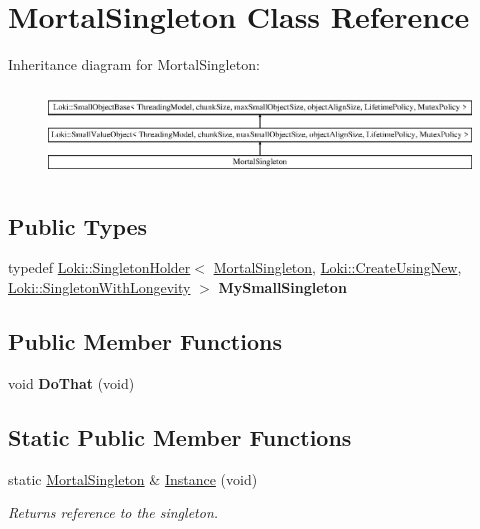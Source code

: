 \hypertarget{classMortalSingleton}{}\section{Mortal\+Singleton Class Reference}
\label{classMortalSingleton}
Inheritance diagram for Mortal\+Singleton\+:\begin{figure}[H]
\begin{center}
\leavevmode
\includegraphics[height=2.349650cm]{classMortalSingleton}
\end{center}
\end{figure}
\subsection*{Public Types}
\begin{DoxyCompactItemize}
\item 
\hypertarget{classMortalSingleton_a3e2bd92c0ada90907983bde3a031f689}{}typedef \hyperlink{classLoki_1_1SingletonHolder}{Loki\+::\+Singleton\+Holder}$<$ \hyperlink{classMortalSingleton}{Mortal\+Singleton}, \hyperlink{structLoki_1_1CreateUsingNew}{Loki\+::\+Create\+Using\+New}, \hyperlink{classLoki_1_1SingletonWithLongevity}{Loki\+::\+Singleton\+With\+Longevity} $>$ {\bfseries My\+Small\+Singleton}\label{classMortalSingleton_a3e2bd92c0ada90907983bde3a031f689}

\end{DoxyCompactItemize}
\subsection*{Public Member Functions}
\begin{DoxyCompactItemize}
\item 
\hypertarget{classMortalSingleton_aed9ffe25387b1cd0b24413bf0f9f3a29}{}void {\bfseries Do\+That} (void)\label{classMortalSingleton_aed9ffe25387b1cd0b24413bf0f9f3a29}

\end{DoxyCompactItemize}
\subsection*{Static Public Member Functions}
\begin{DoxyCompactItemize}
\item 
\hypertarget{classMortalSingleton_aacdba436e7637772d1804508c4be2a59}{}static \hyperlink{classMortalSingleton}{Mortal\+Singleton} \& \hyperlink{classMortalSingleton_aacdba436e7637772d1804508c4be2a59}{Instance} (void)\label{classMortalSingleton_aacdba436e7637772d1804508c4be2a59}

\begin{DoxyCompactList}\small\item\em Returns reference to the singleton. \end{DoxyCompactList}\end{DoxyCompactItemize}
